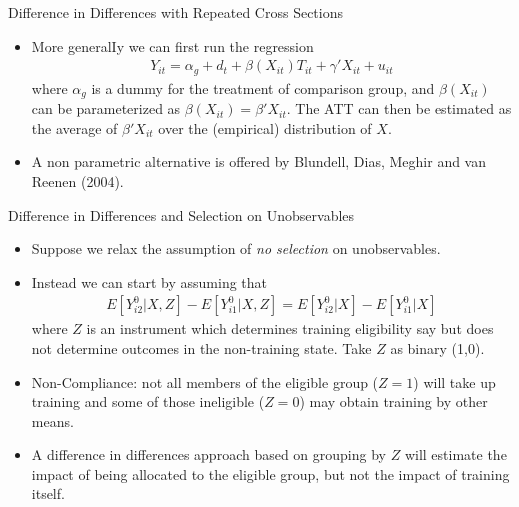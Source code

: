 \begin{frame}{Difference in Differences with Repeated Cross Sections}
\begin{itemize}
\item More generalIy we can first run the regression 
\begin{align*}
Y_{it} = \alpha_g + d_t + \beta (X_{it}) T_{it} + \gamma' X_{it} + u_{it}
\end{align*} 
where $\alpha_g$ is a dummy for the treatment of comparison group, and $\beta (X_{it})$ can be parameterized as $\beta(X_{it}) = \beta' X_{it}$. The ATT can then be estimated as the average of $\beta' X_{it}$ over the (empirical) distribution of $X$.
\item A non parametric alternative is offered by Blundell, Dias, Meghir and van Reenen (2004).
\end{itemize}
\end{frame}

\begin{frame}{Difference in Differences and Selection on Unobservables}
\begin{itemize}
\item Suppose we relax the assumption of \emph{no selection} on unobservables. 
\item Instead we can start by assuming that
\begin{align*}
E[Y_{i2}^0 | X,Z] - E[Y_{i1}^0 | X,Z] = E[Y_{i2}^0 | X] - E[Y_{i1}^0 | X]
\end{align*} 
where $Z$ is an instrument which determines training eligibility say but does not determine outcomes in the non-training state. Take $Z$ as binary (1,0).
\item Non-Compliance: not all members of the eligible group ($Z = 1$) will take up training and some of those ineligible ($Z = 0$) may obtain training by other means.
\item A difference in differences approach based on grouping by $Z$ will estimate the impact of being allocated to the eligible group, but not the impact of training itself.
\end{itemize}
\end{frame}

